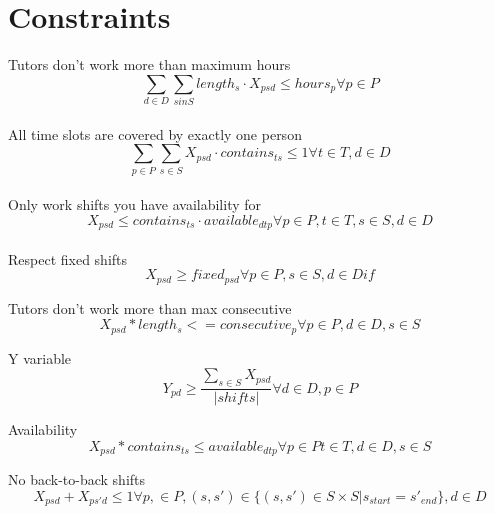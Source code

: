 \documentclass{article}
\begin{document}
\section*{Constraints}
Tutors don't work more than maximum hours
$$\sum_{d \in D} \sum_{s in S} length_s \cdot X_{psd} \leq hours_p \forall p \in P$$ \\

All time slots are covered by exactly one person %
$$\sum_{p \in P} \sum_{s \in S} X_{psd} \cdot contains_{ts} \leq 1 \forall t \in T, d \in D$$ \\

Only work shifts you have availability for %
$$X_{psd} \leq contains_{ts} \cdot available_{dtp} \forall p \in P, t \in T, s \in S, d \in D $$ \\

Respect fixed shifts
$$X_{psd} \geq fixed_{psd} \forall p \in P, s \in S, d \in D if $$

Tutors don't work more than max consecutive
$$ X_{psd} * length_{s} <= consecutive_{p} \forall p \in P, d \in D, s \in S$$

Y variable
$$Y_{pd} \geq \frac{\sum_{s \in S} X_{psd}}{|shifts|}  \forall d \in D, p \in P$$

Availability
$$X_{psd} * contains_{ts} \leq available_{dtp} \forall p \in P t \in T, d \in D, s \in S$$

No back-to-back shifts
$$X_{psd} + X_{ps'd} \leq 1 \forall p, \in P, (s, s') \in \{(s, s') \in  S \times S | s_{start} = s'_{end}\}, d \in D$$ 
\end{document}
